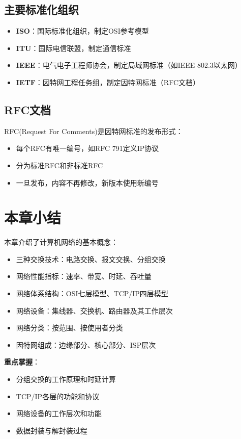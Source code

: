 \subsection{主要标准化组织}
\begin{itemize}[leftmargin=2em,itemsep=0pt]
    \item \textbf{ISO}：国际标准化组织，制定OSI参考模型
    \item \textbf{ITU}：国际电信联盟，制定通信标准
    \item \textbf{IEEE}：电气电子工程师协会，制定局域网标准（如IEEE 802.3以太网）
    \item \textbf{IETF}：因特网工程任务组，制定因特网标准（RFC文档）
\end{itemize}

\subsection{RFC文档}
RFC(Request For Comments)是因特网标准的发布形式：
\begin{itemize}[leftmargin=2em,itemsep=0pt]
    \item 每个RFC有唯一编号，如RFC 791定义IP协议
    \item 分为标准RFC和非标准RFC
    \item 一旦发布，内容不再修改，新版本使用新编号
\end{itemize}

\section{本章小结}
本章介绍了计算机网络的基本概念：
\begin{itemize}[leftmargin=2em,itemsep=0pt]
    \item 三种交换技术：电路交换、报文交换、分组交换
    \item 网络性能指标：速率、带宽、时延、吞吐量
    \item 网络体系结构：OSI七层模型、TCP/IP四层模型
    \item 网络设备：集线器、交换机、路由器及其工作层次
    \item 网络分类：按范围、按使用者分类
    \item 因特网组成：边缘部分、核心部分、ISP层次
\end{itemize}

\textbf{重点掌握}：
\begin{itemize}[leftmargin=2em,itemsep=0pt]
    \item 分组交换的工作原理和时延计算
    \item TCP/IP各层的功能和协议
    \item 网络设备的工作层次和功能
    \item 数据封装与解封装过程
\end{itemize}
